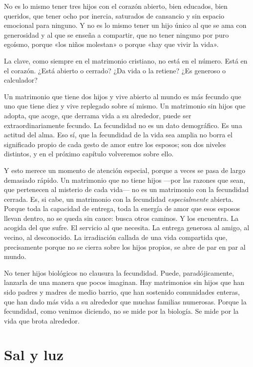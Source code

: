 No es lo mismo tener tres hijos con el corazón abierto, bien educados, bien queridos, que tener ocho por inercia, saturados de cansancio y sin espacio emocional para ninguno. Y no es lo mismo tener un hijo único al que se ama con generosidad y al que se enseña a compartir, que no tener ninguno por puro egoísmo, porque «los niños molestan» o porque «hay que vivir la vida».

La clave, como siempre en el matrimonio cristiano, no está en el número. Está en el corazón. ¿Está abierto o cerrado? ¿Da vida o la retiene? ¿Es generoso o calculador?

Un matrimonio que tiene dos hijos y vive abierto al mundo es más fecundo que uno que tiene diez y vive replegado sobre sí mismo. Un matrimonio sin hijos que adopta, que acoge, que derrama vida a su alrededor, puede ser extraordinariamente fecundo. La fecundidad no es un dato demográfico. Es una actitud del alma. Eso sí, que la fecundidad de la vida sea amplia no borra el significado propio de cada gesto de amor entre los esposos; son dos niveles distintos, y en el próximo capítulo volveremos sobre ello.

Y esto merece un momento de atención especial, porque a veces se pasa de largo demasiado rápido. Un matrimonio que no tiene hijos ---por las razones que sean, que pertenecen al misterio de cada vida--- no es un matrimonio con la fecundidad cerrada. Es, si cabe, un matrimonio con la fecundidad \emph{especialmente} abierta. Porque toda la capacidad de entrega, toda la energía de amor que esos esposos llevan dentro, no se queda sin cauce: busca otros caminos. Y los encuentra. La acogida del que sufre. El servicio al que necesita. La entrega generosa al amigo, al vecino, al desconocido. La irradiación callada de una vida compartida que, precisamente porque no se cierra sobre los hijos propios, se abre de par en par al mundo.

No tener hijos biológicos no clausura la fecundidad. Puede, paradójicamente, lanzarla de una manera que pocos imaginan. Hay matrimonios sin hijos que han sido padres y madres de medio barrio, que han sostenido comunidades enteras, que han dado más vida a su alrededor que muchas familias numerosas. Porque la fecundidad, como venimos diciendo, no se mide por la biología. Se mide por la vida que brota alrededor.

\section{Sal y luz}

